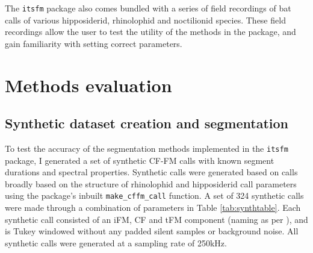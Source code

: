 \documentclass[
]{book}
\begin{document}
The \texttt{itsfm} package also comes bundled with a series of field recordings of bat calls of various hipposiderid, rhinolophid and noctilionid species. These field recordings allow the user to test the utility of the methods in the package, and gain familiarity with setting correct parameters.

\hypertarget{methods-evaluation}{%
\section{Methods evaluation}\label{methods-evaluation}}

\hypertarget{synthetic-dataset-creation-and-segmentation}{%
\subsection{Synthetic dataset creation and segmentation}\label{synthetic-dataset-creation-and-segmentation}}

To test the accuracy of the segmentation methods implemented in the \texttt{itsfm} package, I generated a set of synthetic CF-FM calls with known segment durations and spectral properties. Synthetic calls were generated based on calls broadly based on the structure of rhinolophid and hipposiderid call parameters using the package's inbuilt \texttt{make\_cffm\_call} function. A set of 324 synthetic calls were made through a combination of parameters in Table \ref{tab:synthtable}. Each synthetic call consisted of an iFM, CF and tFM component (naming as per \citep{tian1997echolocation}), and is Tukey windowed without any padded silent samples or background noise. All synthetic calls were generated at a sampling rate of 250kHz.

\providecommand{\docline}[3]{\noalign{\global\setlength{\arrayrulewidth}{#1}}\arrayrulecolor[HTML]{#2}\cline{#3}}

\setlength{\tabcolsep}{8pt}

\renewcommand*{\arraystretch}{1.5}
\end{document}
